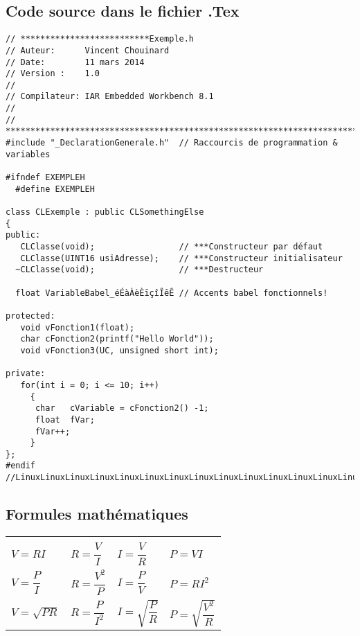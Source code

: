 \subsection{Code source dans le fichier .Tex}
\begin{lstlisting}[label={list:first},caption=Code source en directe]
// **************************Exemple.h
// Auteur:      Vincent Chouinard
// Date:        11 mars 2014
// Version :    1.0
//
// Compilateur: IAR Embedded Workbench 8.1
//
// *****************************************************************************
#include "_DeclarationGenerale.h"  // Raccourcis de programmation & variables

#ifndef EXEMPLEH
  #define EXEMPLEH

class CLExemple : public CLSomethingElse
{
public:
   CLClasse(void);                 // ***Constructeur par défaut
   CLClasse(UINT16 usiAdresse);    // ***Constructeur initialisateur
  ~CLClasse(void);                 // ***Destructeur
  
  float VariableBabel_éÉàÀèÈïçîÎêÊ // Accents babel fonctionnels!

protected:
   void vFonction1(float);
   char cFonction2(printf("Hello World"));
   void vFonction3(UC, unsigned short int);

private:
   for(int i = 0; i <= 10; i++)
     {
      char   cVariable = cFonction2() -1;
      float  fVar;
      fVar++;
     }
};
#endif
//LinuxLinuxLinuxLinuxLinuxLinuxLinuxLinuxLinuxLinuxLinuxLinuxLinuxLinuxLinuxTUX

\end{lstlisting}
\pagebreak

\subsection{Formules mathématiques}
\begin{table}[ht]
\begin{center}
\begin{tabular}{llll}  
    \hline
    \multicolumn{4}{c}{}\\
    
    \bigskip
    
    $V=RI$&$R=\dfrac{V}{I}$&$I=\dfrac{V}{R}$&$P=VI$\\
    
    \bigskip
    
    $V=\dfrac{P}{I}$&$R=\dfrac{V^{2}}         {P}$&$I=\dfrac{P}{V}$&$P=RI^{2}$\\ 
    
   \bigskip 
    
    $V=\sqrt{PR}$&$R=\dfrac{P}{I^{2}}$&$I=\sqrt{\dfrac{P}{R}}$&$P=\sqrt{\dfrac{V^{2}}{R}}$\\
    \hline
\end{tabular}
\end{center}
\label{tab:multicol}
\end{table}


